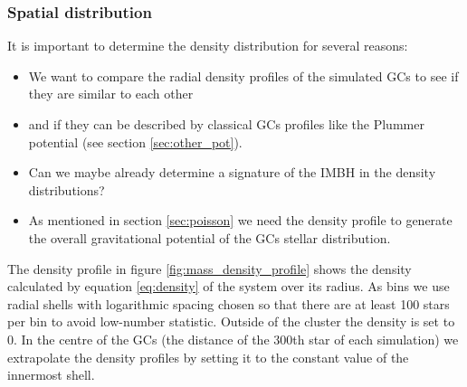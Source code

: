 \subsubsection{Spatial distribution}\label{sec:spatial_dist}
It is important to determine the density distribution for several reasons:
\begin{itemize}
\item We want to compare the radial density profiles of the simulated \acp{GC} to see if they are similar to each other
\item and if they can be described by classical \acp{GC} profiles like the Plummer potential (see section \ref{sec:other_pot}).
\item Can we maybe already determine a signature of the \ac{IMBH} in the density distributions?
\item As mentioned in section \ref{sec:poisson} we need the density profile to generate the overall gravitational potential of the \acp{GC} stellar distribution. 
\end{itemize}
The density profile in figure \ref{fig:mass_density_profile} shows the density calculated by equation \eqref{eq:density} of the system over its radius. As bins we use radial shells with logarithmic spacing chosen so that there are at least 100 stars per bin to avoid low-number statistic. Outside of the cluster the density is set to 0. In the centre of the \acp{GC} (the distance of the 300th star of each simulation) we extrapolate the density profiles by setting it to the constant value of the innermost shell. 

